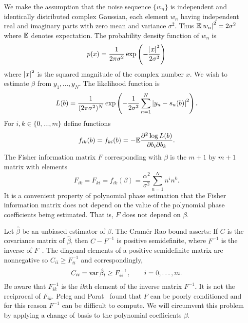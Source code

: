 \documentclass[5p]{elsarticle}
\begin{document}
We make the assumption that the noise sequence $\{ w_n \}$ is independent and identically distributed complex Gaussian, each element $w_n$ having independent real and imaginary parts with zero mean and variance $\sigma^2$. Thus ${\mathbb E}{\left| w_n \right|}^2 = 2\sigma^2$ where ${\mathbb E}$ denotes expectation.  The probability density function of $w_n$ is 
\[
p(x) = \frac{1}{2 \pi \sigma^2} \exp\left( -\frac{{\left| x \right|}^2}{2\sigma^2} \right)
\]
where ${\left| x \right|}^2$ is the squared magnitude of the complex number $x$.  We wish to estimate $\beta$ from $y_1, \dots, y_N$.  The likelihood function is
\[
L(b) = \frac{1}{(2 \pi \sigma^2)^N} \exp\left( - \frac{1}{2\sigma^{2}} \sum_{n=1}^N {\left| y_n -  s_n(b)  \right|}^2 \right).
\]
For $i,k \in \{0, \dots, m\}$ define functions 
\[
f_{ik}(b) = f_{ki}(b) = -{\mathbb E} \frac{ \partial^2 \log L(b) }{ \partial b_{i} \partial b_{k}}.
\]  
The Fisher information matrix $F$ corresponding with $\beta$ is the $m+1$ by $m+1$ matrix with elements
\[
F_{ik} = F_{ki} = f_{ik}(\beta) = \frac{\alpha^2}{\sigma^2}\sum_{n=1}^{N} n^{i}n^{k}.
\]
It is a convenient property of polynomial phase estimation that the Fisher information matrix does not depend on the value of the polynomial phase coefficients being estimated.  That is, $F$ does not depend on $\beta$.

Let $\hat{\beta}$ be an unbiased estimator of $\beta$.  The Cram\'{e}r-Rao bound asserts:  If $C$ is the covariance matrix of $\hat{\beta}$, then $C - F^{-1}$ is positive semidefinite, where $F^{-1}$ is the inverse of $F$~\cite{Kay1993_stat_sig_est_theory}.  The diagonal elements of a positive semidefinite matrix are nonnegative so $C_{ii} \geq F^{-1}_{ii}$ and correspondingly, 
\[
C_{ii} = \operatorname{var} \hat{\beta}_{i} \geq F_{ii}^{-1}, \qquad i=0,\dots,m.
\]  
Be aware that $F_{ik}^{-1}$ is the $ik$th element of the inverse matrix $F^{-1}$.  It is not the reciprocal of $F_{ik}$.  Peleg and Porat~\cite{Peleg1991_CRB_PPS_1991} found that $F$ can be poorly conditioned and for this reason $F^{-1}$ can be difficult to compute.   We will circumvent this problem by applying a change of basis to the polynomial coefficients $\beta$.  %
\end{document}
